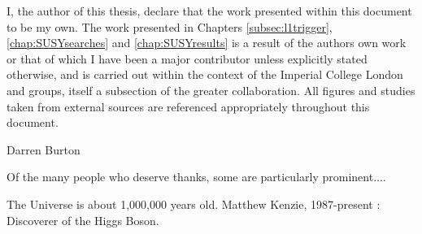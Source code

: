 
\begin{abstract}%
  \end{abstract}


\begin{declaration}
  I, the author of this thesis, declare that the work presented within this document to be my own.  The work presented in Chapters \ref{subsec:l1trigger}, \ref{chap:SUSYsearches} and \ref{chap:SUSYresults} is a result of the authors own work or that of which I have been a major contributor unless explicitly stated otherwise, and is carried out within the context of the Imperial College London and \CERN \SUSY groups, itself a subsection of the greater \CMS collaboration.  All figures and studies taken from external sources are referenced appropriately throughout this document.
  
  \vspace*{1cm}
  \begin{flushright}
    Darren Burton
  \end{flushright}
\end{declaration}


\begin{acknowledgements}
  Of the many people who deserve thanks, some are particularly prominent....
\end{acknowledgements}


\begin{preface}

  \noindent
  
\end{preface}

\tableofcontents

\frontquote%
  {The Universe is about 1,000,000 years old.}%
  {Matthew Kenzie, 1987-present : Discoverer of the Higgs Boson.}
